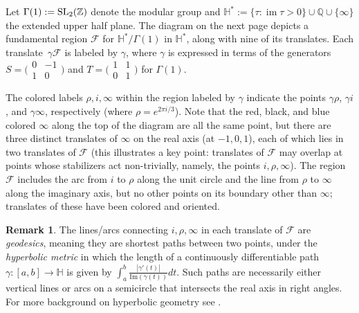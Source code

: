 \documentclass[11pt]{article}
\newcommand{\Q}{\mathbb{Q}}
\renewcommand{\H}{\mathbb{H}}
\newcommand{\Z}{\mathbb{Z}}
\newcommand{\im}{\operatorname{im}}
\newcommand{\SL}{{\rm SL}}
\theoremstyle{definition}
\newtheorem*{remark}{Remark}
\begin{document}
Let $\Gamma(1):=\SL_2(\Z)$ denote the modular group and $\H^*:=\{\tau:\im\tau>0\}\cup \Q\cup \{\infty\}$ the extended upper half plane.
The diagram on the next page depicts a fundamental region $\mathcal{F}$ for $\H^*/\Gamma(1)$ in $\H^*$, along with nine of its translates.
Each translate~$\gamma \mathcal F$ is labeled by $\gamma$, where $\gamma$ is expressed in terms of the generators $S=\bigl(\begin{smallmatrix}0&-1\\1&0\end{smallmatrix}\bigr)$ and $T=\bigl(\begin{smallmatrix}1&1\\0&1\end{smallmatrix}\bigr)$ for $\Gamma(1)$.

The colored labels $\rho,i,\infty$ within the region labeled by $\gamma$ indicate the points $\gamma\rho$, $\gamma i$, and $\gamma\infty$, respectively (where $\rho=e^{2\pi i/3}$).
Note that the red, black, and blue colored $\infty$ along the top of the diagram are all the same point, but there are three distinct translates of $\infty$ on the real axis (at $-1,0,1$), each of which lies in two translates of $\mathcal{F}$ (this illustrates a key point: translates of $\mathcal{F}$ may overlap at points whose stabilizers act non-trivially, namely, the points $i,\rho,\infty$).
The region $\mathcal F$ includes the arc from $i$ to $\rho$ along the unit circle and the line from $\rho$ to $\infty$ along the imaginary axis, but no other points on its boundary other than $\infty$; translates of these have been colored and oriented.

\begin{remark}
The lines/arcs connecting $i,\rho,\infty$ in each translate of $\mathcal F$ are \emph{geodesics}, meaning they are shortest paths between two points, under the \emph{hyperbolic metric} in which the length of a continuously differentiable path $\gamma\colon [a,b]\to\mathbb H$ is given by $\int_a^b\frac{|\gamma'(t)|}{\mathrm{Im}(\gamma(t))}dt$.  Such paths are necessarily either vertical lines or arcs on a semicircle that intersects the real axis in right angles.  For more background on hyperbolic geometry see \cite[Ch.~33]{voight}.
\end{remark}
\end{document}
